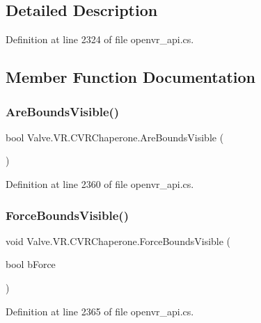 \subsection{Detailed Description}


Definition at line 2324 of file openvr\+\_\+api.\+cs.



\subsection{Member Function Documentation}
\mbox{\label{class_valve_1_1_v_r_1_1_c_v_r_chaperone_a4330cb2ee583a6a60b828e219198b531}} 
\subsubsection{\texorpdfstring{AreBoundsVisible()}{AreBoundsVisible()}}
{\footnotesize\ttfamily bool Valve.\+V\+R.\+C\+V\+R\+Chaperone.\+Are\+Bounds\+Visible (\begin{DoxyParamCaption}{ }\end{DoxyParamCaption})}



Definition at line 2360 of file openvr\+\_\+api.\+cs.

\mbox{\label{class_valve_1_1_v_r_1_1_c_v_r_chaperone_a02d54b6cb624de54d0766e1cf9a0d44f}} 
\subsubsection{\texorpdfstring{ForceBoundsVisible()}{ForceBoundsVisible()}}
{\footnotesize\ttfamily void Valve.\+V\+R.\+C\+V\+R\+Chaperone.\+Force\+Bounds\+Visible (\begin{DoxyParamCaption}\item[{bool}]{b\+Force }\end{DoxyParamCaption})}



Definition at line 2365 of file openvr\+\_\+api.\+cs.

